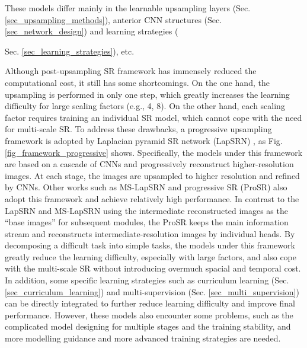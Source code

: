 These models differ mainly in the learnable upsampling layers (Sec. \ref{sec_upsampling_methods}), anterior CNN structures (Sec. \ref{sec_network_design}) and learning strategies ({Sec. \ref{sec_learning_strategies}), etc.

\label{sec_framework_progressive}
Although post-upsampling SR framework has immensely reduced the computational cost, it still has some shortcomings.
On the one hand, the upsampling is performed in only one step, which greatly increases the learning difficulty for large scaling factors (e.g., 4, 8).
On the other hand, each scaling factor requires training an individual SR model, which cannot cope with the need for multi-scale SR.
To address these drawbacks, a progressive upsampling framework is adopted by Laplacian pyramid SR network (LapSRN) , as Fig. \ref{fig_framework_progressive} shows.
Specifically, the models under this framework are based on a cascade of CNNs and progressively reconstruct higher-resolution images.
At each stage, the images are upsampled to higher resolution and refined by CNNs.
Other works such as MS-LapSRN  and progressive SR (ProSR)  also adopt this framework and achieve relatively high performance.
In contrast to the LapSRN and MS-LapSRN using the intermediate reconstructed images as the ``base images'' for subsequent modules, the ProSR keeps the main information stream and reconstructs intermediate-resolution images by individual heads.
By decomposing a difficult task into simple tasks, the models under this framework greatly reduce the learning difficulty, especially with large factors, and also cope with the multi-scale SR without introducing overmuch spacial and temporal cost.
In addition, some specific learning strategies such as curriculum learning (Sec. \ref{sec_curriculum_learning}) and multi-supervision (Sec. \ref{sec_multi_supervision}) can be directly integrated to further reduce learning difficulty and improve final performance.
However, these models also encounter some problems, such as the complicated model designing for multiple stages and the training stability, and more modelling guidance and more advanced training strategies are needed.

}
